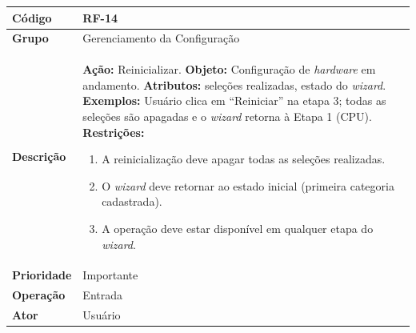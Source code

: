 \FloatBarrier
\begin{quadro}[htb]
  \caption{RF-14 -- Reinicializar a configuração}
  \label{quad:rf14}
  \begin{tabular}{|p{3.2cm}|p{11.8cm}|}
    \hline
    \textbf{Código}     & RF-14                                                               \\ \hline
    \textbf{Grupo}      & Gerenciamento da Configuração                                       \\ \hline
    \textbf{Descrição}  &
    \textbf{Ação:} Reinicializar.
    \textbf{Objeto:} Configuração de \textit{hardware} em andamento.
    \textbf{Atributos:} seleções realizadas, estado do \textit{wizard}.
    \textbf{Exemplos:} Usuário clica em ``Reiniciar'' na etapa 3; todas as seleções são apagadas e o \textit{wizard} retorna à Etapa 1 (CPU).
    \textbf{Restrições:}
    \begin{enumerate}[nosep,leftmargin=1.2em,topsep=2pt,partopsep=0pt,parsep=0pt,itemsep=1pt]
      \item A reinicialização deve apagar todas as seleções realizadas.
      \item O \textit{wizard} deve retornar ao estado inicial (primeira categoria cadastrada).
      \item A operação deve estar disponível em qualquer etapa do \textit{wizard}.
    \end{enumerate} \\ \hline
    \textbf{Prioridade} & Importante                                                          \\ \hline
    \textbf{Operação}   & Entrada                                                             \\ \hline
    \textbf{Ator}       & Usuário                                                             \\ \hline
  \end{tabular}
\end{quadro}

